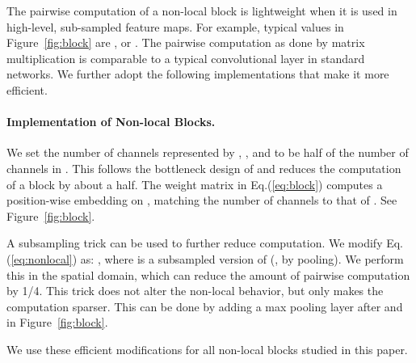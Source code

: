 \documentclass[10pt,twocolumn,letterpaper]{article}
\begin{document}
The pairwise computation of a non-local block is lightweight when it is used in high-level, sub-sampled feature maps. For example, typical values in Figure~\ref{fig:block} are ,  or . The pairwise computation as done by matrix multiplication is comparable to a typical convolutional layer in standard networks.
We further adopt the following implementations that make it more efficient.

\paragraph{Implementation of Non-local Blocks.}
We set the number of channels represented by , , and  to be half of the number of channels in . This follows the bottleneck design of \cite{He2016} and reduces the computation of a block by about a half. The weight matrix  in Eq.(\ref{eq:block}) computes a position-wise embedding on , matching the number of channels to that of . See Figure~\ref{fig:block}.

A subsampling trick can be used to further reduce computation. We modify Eq.(\ref{eq:nonlocal}) as:  , where  is a subsampled version of  (\eg, by pooling). We perform this in the spatial domain, which can reduce the amount of pairwise computation by 1/4. This trick does not alter the non-local behavior, but only makes the computation sparser. This can be done by adding a max pooling layer after  and  in Figure~\ref{fig:block}.

We use these efficient modifications for all non-local blocks studied in this paper.
\end{document}
